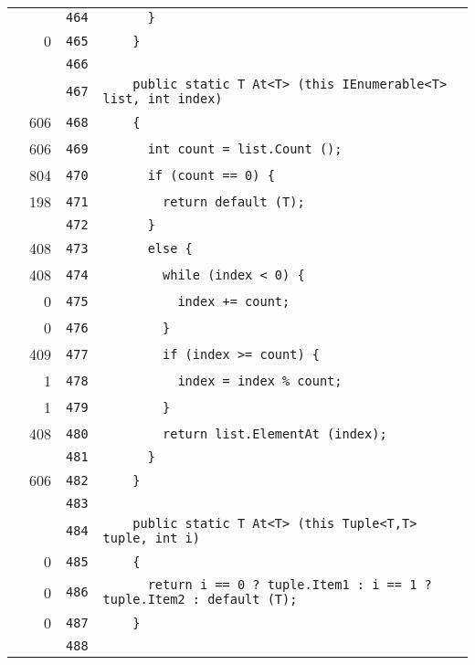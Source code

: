 \documentclass[a4paper,10pt]{article}
\begin{document}
\begin{longtable}[l]{lrrl}
\cellcolor{gray} &  & \verb~464~ & \verb~      }~\\
\cellcolor{red} & 0 & \verb~465~ & \verb~    }~\\
\cellcolor{gray} &  & \verb~466~ & \verb~~\\
\cellcolor{gray} &  & \verb~467~ & \verb~    public static T At<T> (this IEnumerable<T> list, int index)~\\
\cellcolor{green} & 606 & \verb~468~ & \verb~    {~\\
\cellcolor{green} & 606 & \verb~469~ & \verb~      int count = list.Count ();~\\
\cellcolor{green} & 804 & \verb~470~ & \verb~      if (count == 0) {~\\
\cellcolor{green} & 198 & \verb~471~ & \verb~        return default (T);~\\
\cellcolor{gray} &  & \verb~472~ & \verb~      }~\\
\cellcolor{green} & 408 & \verb~473~ & \verb~      else {~\\
\cellcolor{green} & 408 & \verb~474~ & \verb~        while (index < 0) {~\\
\cellcolor{red} & 0 & \verb~475~ & \verb~          index += count;~\\
\cellcolor{red} & 0 & \verb~476~ & \verb~        }~\\
\cellcolor{green} & 409 & \verb~477~ & \verb~        if (index >= count) {~\\
\cellcolor{green} & 1 & \verb~478~ & \verb~          index = index % count;~\\
\cellcolor{green} & 1 & \verb~479~ & \verb~        }~\\
\cellcolor{green} & 408 & \verb~480~ & \verb~        return list.ElementAt (index);~\\
\cellcolor{gray} &  & \verb~481~ & \verb~      }~\\
\cellcolor{green} & 606 & \verb~482~ & \verb~    }~\\
\cellcolor{gray} &  & \verb~483~ & \verb~~\\
\cellcolor{gray} &  & \verb~484~ & \verb~    public static T At<T> (this Tuple<T,T> tuple, int i)~\\
\cellcolor{red} & 0 & \verb~485~ & \verb~    {~\\
\cellcolor{red} & 0 & \verb~486~ & \verb~      return i == 0 ? tuple.Item1 : i == 1 ? tuple.Item2 : default (T);~\\
\cellcolor{red} & 0 & \verb~487~ & \verb~    }~\\
\cellcolor{gray} &  & \verb~488~ & \verb~~\\

\end{longtable}
\end{document}
